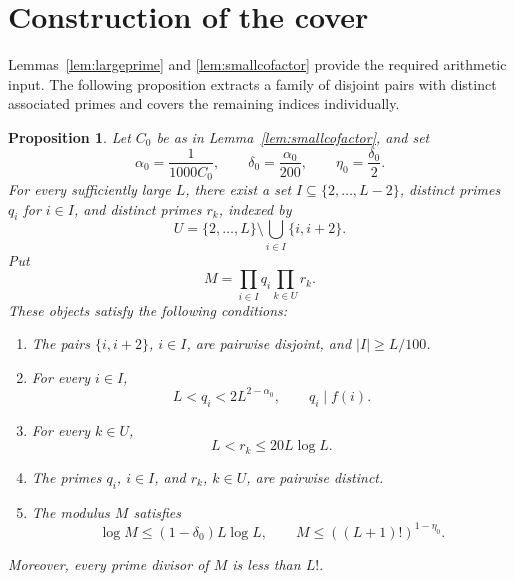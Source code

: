 \documentclass[11pt]{amsart}
\newtheorem{proposition}[theorem]{Proposition}
\theoremstyle{definition}
\theoremstyle{remark}
\begin{document}
\section{Construction of the cover}

Lemmas~\ref{lem:largeprime} and \ref{lem:smallcofactor} provide the required
arithmetic input.  The following proposition extracts a family of disjoint
pairs with distinct associated primes and covers the remaining indices
individually.

\begin{proposition}\label{prop:quadratic-cover}
Let $C_0$ be as in Lemma~\ref{lem:smallcofactor}, and set
\[
\alpha_0=\frac1{1000C_0},
\qquad
\delta_0=\frac{\alpha_0}{200},
\qquad
\eta_0=\frac{\delta_0}{2}.
\]
For every sufficiently large $L$, there exist a set
$I\subseteq\{2,\ldots,L-2\}$, distinct primes $q_i$ for $i\in I$, and
distinct primes $r_k$, indexed by
\[
U=\{2,\ldots,L\}\setminus\bigcup_{i\in I}\{i,i+2\}.
\]
Put
\[
M=\prod_{i\in I}q_i\prod_{k\in U}r_k.
\]
These objects satisfy the following conditions:
\begin{enumerate}
\item The pairs $\{i,i+2\}$, $i\in I$, are pairwise disjoint, and
$|I|\geq L/100$.
\item For every $i\in I$,
\[
L<q_i<2L^{2-\alpha_0},
\qquad
q_i\mid f(i).
\]
\item For every $k\in U$,
\[
L<r_k\leq20L\log L.
\]
\item The primes $q_i$, $i\in I$, and $r_k$, $k\in U$, are pairwise
distinct.
\item The modulus $M$ satisfies
\[
\log M\leq(1-\delta_0)L\log L,
\qquad
M\leq ((L+1)!)^{1-\eta_0}.
\]
\end{enumerate}
Moreover, every prime divisor of $M$ is less than $L!$.
\end{proposition}
\end{document}
